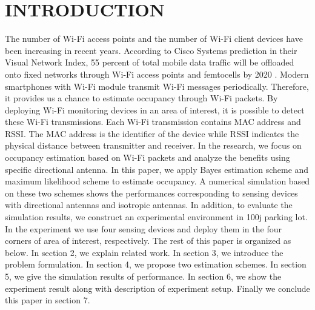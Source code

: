 \chapter[INTRODUCTION]{INTRODUCTION}
The number of Wi-Fi access points and the number of Wi-Fi client devices have been increasing in recent years. According to Cisco Systems prediction in their Visual Network Index, 55 percent of total mobile data traffic will be offloaded onto fixed networks through Wi-Fi access points and femtocells by 2020 \cite{CiscoVNI2016}. Modern smartphones with Wi-Fi module transmit Wi-Fi messages periodically. Therefore, it provides us a chance to estimate occupancy through Wi-Fi packets. By deploying Wi-Fi monitoring devices in an area of interest, it is possible to detect these Wi-Fi transmissions. Each Wi-Fi transmission contains MAC address and RSSI. The MAC address is the identifier of the device while RSSI indicates the physical distance between transmitter and receiver. In the research, we focus on occupancy estimation based on Wi-Fi packets and analyze the benefits using specific directional antenna.
In this paper, we apply Bayes estimation scheme and maximum likelihood scheme to estimate occupancy. A numerical simulation based on these two schemes shows the performances corresponding to sensing devices with directional antennas and isotropic antennas. In addition, to evaluate the simulation results, we construct an experimental environment in 100j parking lot. In the experiment we use four sensing devices and deploy them in the four corners of area of interest, respectively.
The rest of this paper is organized as below. In section 2, we explain related work. In section 3, we introduce the problem formulation. In section 4, we propose two estimation schemes. In section 5, we give the simulation results of performance. In section 6, we show the experiment result along with description of experiment setup. Finally we conclude this paper in section 7.

 






 


